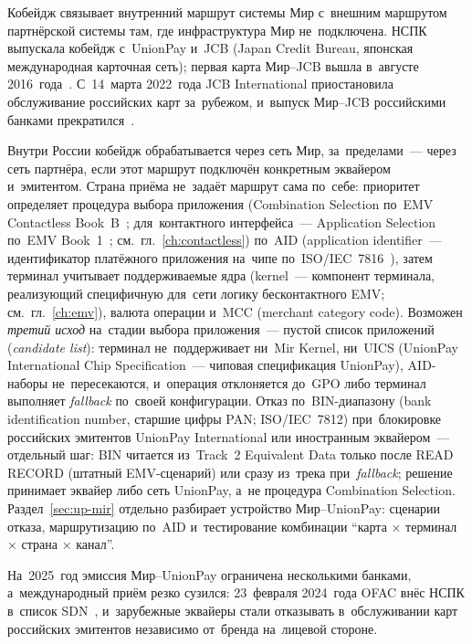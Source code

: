 Кобейдж связывает внутренний маршрут системы Мир с~внешним
маршрутом партнёрской системы там, где инфраструктура Мир не~подключена. НСПК
выпускала кобейдж с~UnionPay и~JCB (Japan Credit Bureau, японская
международная карточная сеть); первая карта Мир--JCB вышла в~августе
2016~года~\cite{unionpayintl-nspk-card-issuance,nspk-jcb-cobadge}. С~14~марта
2022~года JCB International приостановила обслуживание российских карт
за~рубежом, и~выпуск Мир--JCB российскими банками прекратился~\cite{jcb-suspension-2022}.

Внутри России кобейдж обрабатывается через сеть Мир,
за~пределами~--- через сеть партнёра, если этот маршрут подключён конкретным
эквайером и~эмитентом. Страна приёма не~задаёт маршрут сама по~себе: приоритет
определяет процедура выбора приложения (Combination Selection
  по~EMV Contactless Book~B~\cite{emvco-contactless-book-b};
  для~контактного интерфейса~--- Application Selection по~EMV
Book~1~\cite{emvco-book1}; см.~гл.~\ref{ch:contactless}) по~AID (application
  identifier~--- идентификатор платёжного приложения на~чипе
по~ISO/IEC~7816~\cite{iso-7816-5}), затем терминал учитывает поддерживаемые
ядра (kernel~--- компонент терминала, реализующий специфичную для~сети
логику бесконтактного EMV; см.~гл.~\ref{ch:emv}), валюта операции
и~MCC (merchant category code). Возможен \emph{третий исход} на~стадии выбора
приложения~--- пустой список приложений (\textit{candidate list}): терминал
не~поддерживает ни~Mir Kernel,
ни~UICS (UnionPay International Chip Specification~--- чиповая
спецификация UnionPay), AID-наборы не~пересекаются, и~операция отклоняется
до~GPO либо терминал выполняет \textit{fallback} по~своей конфигурации. Отказ
по~BIN-диапазону (bank identification number, старшие цифры PAN; ISO/IEC~7812)
при~блокировке российских эмитентов UnionPay International или иностранным
эквайером~--- отдельный шаг: BIN читается из~Track~2 Equivalent Data только
после READ RECORD (штатный EMV-сценарий) или сразу из~трека
при~\textit{fallback}; решение принимает эквайер либо сеть UnionPay,
а~не процедура Combination Selection. Раздел~\ref{sec:up-mir} отдельно
разбирает устройство Мир--UnionPay: сценарии отказа, маршрутизацию по~AID
и~тестирование комбинации \enquote{карта × терминал × страна × канал}.

На~2025~год эмиссия Мир--UnionPay ограничена несколькими банками,
а~международный приём резко сузился: 23~февраля 2024~года OFAC внёс НСПК
в~список SDN~\cite{ofac-jy2117-nspk}, и~зарубежные эквайеры стали отказывать в~обслуживании карт
российских эмитентов независимо от~бренда на~лицевой стороне.

